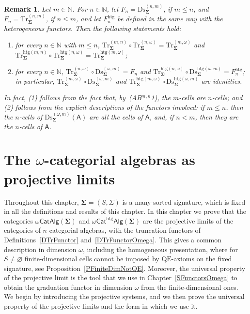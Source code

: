 \documentclass[a4paper, reqno]{amsbook}
\newcommand{\sig}[1]{\mathbf{#1}}             %
\newcommand{\calg}[1]{\boldsymbol{\mathsf{#1}}} %
\newcommand{\QE}{\mathrm{QE}}
\newcommand{\htg}{\mathrm{htg}}                %
\newcommand{\Ds}{\mathrm{Ds}}
\newcommand{\Tr}{\mathrm{Tr}}
\theoremstyle{plain}
\newtheorem{remark}[theorem]{Remark}
\theoremstyle{definition}
\begin{document}
\begin{remark}\label{RDsTrCompOmega}
Let $m\in\mathbb{N}$.
For $n\in\mathbb{N}$, let $F_{n}=\Ds^{(n,m)}_{\sig{\Sigma}}$, if $m\leq n$, and $F_{n}=\Tr^{(n,m)}_{\sig{\Sigma}}$, if $n\leq m$, and let $F^{\htg}_{n}$ be defined in the same way with the heterogeneous functors.
Then the following statements hold:
\begin{enumerate}
\item for every $n\in\mathbb{N}$ with $m\leq n$, $\Tr^{(m,n)}_{\sig{\Sigma}}\circ\Tr^{(n,\omega)}_{\sig{\Sigma}}=\Tr^{(m,\omega)}_{\sig{\Sigma}}$ and $\Tr^{\htg(m,n)}_{\sig{\Sigma}}\circ\Tr^{\htg(n,\omega)}_{\sig{\Sigma}}=\Tr^{\htg(m,\omega)}_{\sig{\Sigma}}$;
\item for every $n\in\mathbb{N}$, $\Tr^{(n,\omega)}_{\sig{\Sigma}}\circ\Ds^{(\omega,m)}_{\sig{\Sigma}}=F_{n}$ and $\Tr^{\htg(n,\omega)}_{\sig{\Sigma}}\circ\Ds^{\htg(\omega,m)}_{\sig{\Sigma}}=F^{\htg}_{n}$; in particular, $\Tr^{(m,\omega)}_{\sig{\Sigma}}\circ\Ds^{(\omega,m)}_{\sig{\Sigma}}$ and $\Tr^{\htg(m,\omega)}_{\sig{\Sigma}}\circ\Ds^{\htg(\omega,m)}_{\sig{\Sigma}}$ are identities.
\end{enumerate}
In fact, (1) follows from the fact that, by~(AB$^{m,n}$1), the $m$-cells are $n$-cells; and (2) follows from the explicit descriptions of the functors involved: if $m\leq n$, then the $n$-cells of $\Ds^{(\omega,m)}_{\sig{\Sigma}}(\calg{A})$ are all the cells of $\calg{A}$, and, if $n<m$, then they are the $n$-cells of $\calg{A}$.
\end{remark}

\chapter{The \texorpdfstring{$\omega$}{omega}-categorial algebras as projective limits}\label{SProjLimits}

Throughout this chapter, $\sig{\Sigma}=(S,\Sigma)$ is a many-sorted signature, which is fixed in all the definitions and results of this chapter.
In this chapter we prove that the categories $\omega\mathsf{CatAlg}(\sig{\Sigma})$ and $\omega\mathsf{Cat}^{\htg}\mathsf{Alg}(\sig{\Sigma})$ are the projective limits of the categories of $n$-categorial algebras, with the truncation functors of Definitions~\ref{DTrFunctor} and~\ref{DTrFunctorOmega}.
This gives a common description in dimension $\omega$, including the homogeneous presentation, where for $S\neq\varnothing$ finite-dimensional cells cannot be imposed by $\QE$-axioms on the fixed signature, see Proposition~\ref{PFiniteDimNotQE}.
Moreover, the universal property of the projective limit is the tool that we use in Chapter~\ref{SFunctorsOmega} to obtain the graduation functor in dimension $\omega$ from the finite-dimensional ones.
We begin by introducing the projective systems, and we then prove the universal property of the projective limits and the form in which we use it.
\end{document}
